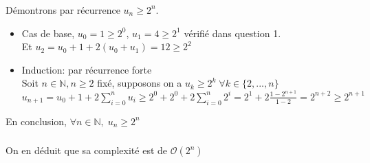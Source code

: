 \documentclass[french]{article}
\begin{document}
\subsubsection{}
Démontrons par récurrence $u_{n} \geq 2^n$.
	\begin{itemize}
	\item 
	Cas de base, $u_{0}=1 \geq 2^0$,  $u_{1} = 4 \geq 2^1$ vérifié dans question 1.\\ Et $u_{2}=u_{0} +1+2(u_{0}+u_{1}) = 12 \geq 2^2$
	\item
	Induction: par récurrence forte\\
Soit $n \in \mathbb{N}, n\geq2 $ fixé, supposons on a $u_{k} \geq 2^k \; \forall k \in \{2, ..., n\}$\\
$u_{n+1}=u_{0}+1+2\sum_{i=0}^{n} u_{i} \geq 2^0 +2^0 + 2\sum_{i=0}^{n} 2^i = 2^1 + 2\frac{1-2^{n+1}}{1-2} = 2^{n+2}  \geq 2^{n+1}$

	\end{itemize}
\par
En conclusion, $\forall n \in \mathbb{N}, \; u_{n}  \geq 2^n$

\subsubsection{}
On en déduit que sa complexité est de $\mathcal{O}(2^n)$
\end{document}
